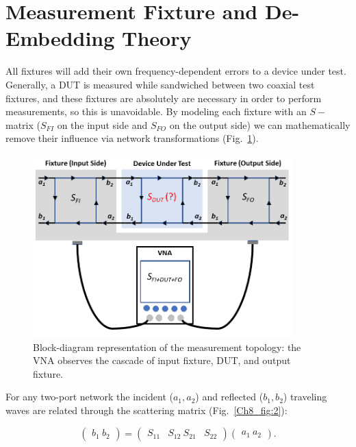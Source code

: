 \section{Measurement Fixture and De-Embedding Theory}
\justifying
All fixtures will add their own frequency-dependent errors to a device under test.
Generally, a DUT is measured while sandwiched between two coaxial test fixtures, and these fixtures are absolutely are necessary in order to perform measurements, so this is unavoidable. 
\cite{ieee370_2020} 
By modeling each fixture with an $S-$matrix ($S_{FI}$ on the input side and $S_{FO}$ on the output side) we can mathematically remove their influence via network transformations (Fig.~\ref{Ch8_fig:1}).

\begin{figure}[H]
\centering
\includegraphics[width=0.9\textwidth]{Chapter_8/images/Lab_08_Figure1.png}
\caption{Block-diagram representation of the measurement topology: the VNA observes the cascade of input fixture, DUT, and output fixture. \cite{deembedding_part1} }
\label{Ch8_fig:1}
\end{figure}

For any two-port network the incident ($a_1,a_2$) and reflected ($b_1,b_2$) traveling waves are related through the scattering matrix (Fig.~\ref{Ch8_fig:2}):

\begin{equation}
\begin{pmatrix} b_1 \ b_2 \end{pmatrix} =
\begin{pmatrix} S_{11} & S_{12} \ S_{21} & S_{22} \end{pmatrix}
\begin{pmatrix} a_1 \ a_2 \end{pmatrix}.
\end{equation}

